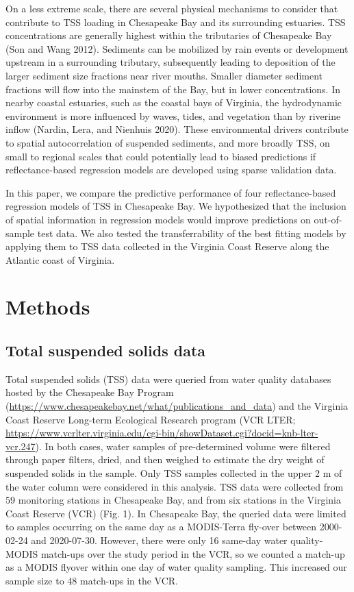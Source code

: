 \documentclass[11pt,]{article}
\begin{document}
On a less extreme scale, there are several physical mechanisms to
consider that contribute to TSS loading in Chesapeake Bay and its
surrounding estuaries. TSS concentrations are generally highest within
the tributaries of Chesapeake Bay (Son and Wang 2012). Sediments can be
mobilized by rain events or development upstream in a surrounding
tributary, subsequently leading to deposition of the larger sediment
size fractions near river mouths. Smaller diameter sediment fractions
will flow into the mainstem of the Bay, but in lower concentrations. In
nearby coastal estuaries, such as the coastal bays of Virginia, the
hydrodynamic environment is more influenced by waves, tides, and
vegetation than by riverine inflow (Nardin, Lera, and Nienhuis 2020).
These environmental drivers contribute to spatial autocorrelation of
suspended sediments, and more broadly TSS, on small to regional scales
that could potentially lead to biased predictions if reflectance-based
regression models are developed using sparse validation data.

In this paper, we compare the predictive performance of four
reflectance-based regression models of TSS in Chesapeake Bay. We
hypothesized that the inclusion of spatial information in regression
models would improve predictions on out-of-sample test data. We also
tested the transferrability of the best fitting models by applying them
to TSS data collected in the Virginia Coast Reserve along the Atlantic
coast of Virginia.

\hypertarget{methods}{%
\section{Methods}\label{methods}}

\hypertarget{total-suspended-solids-data}{%
\subsection{Total suspended solids
data}\label{total-suspended-solids-data}}

Total suspended solids (TSS) data were queried from water quality
databases hosted by the Chesapeake Bay Program
(\url{https://www.chesapeakebay.net/what/publications_and_data}) and the
Virginia Coast Reserve Long-term Ecological Research program (VCR LTER;
\url{https://www.vcrlter.virginia.edu/cgi-bin/showDataset.cgi?docid=knb-lter-vcr.247}).
In both cases, water samples of pre-determined volume were filtered
through paper filters, dried, and then weighed to estimate the dry
weight of suspended solids in the sample. Only TSS samples collected in
the upper 2 m of the water column were considered in this analysis. TSS
data were collected from 59 monitoring stations in Chesapeake Bay, and
from six stations in the Virginia Coast Reserve (VCR) (Fig. 1). In
Chesapeake Bay, the queried data were limited to samples occurring on
the same day as a MODIS-Terra fly-over between 2000-02-24 and
2020-07-30. However, there were only 16 same-day water quality-MODIS
match-ups over the study period in the VCR, so we counted a match-up as
a MODIS flyover within one day of water quality sampling. This increased
our sample size to 48 match-ups in the VCR.
\end{document}
